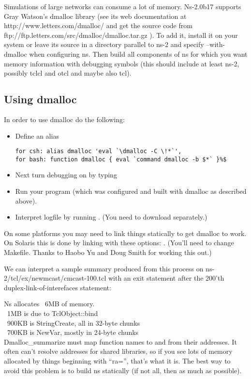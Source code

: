 Simulations of large networks can consume a lot of memory. Ns-2.0b17
supports Gray Watson's dmalloc library (see its web documentation at
http://www.letters.com/dmalloc/ and get the source code from
ftp://ftp.letters.com/src/dmalloc/dmalloc.tar.gz ).
To add it, install it on your system or leave its source in
a directory parallel to ns-2 and specify --with-dmalloc when configuring
ns. Then build all components of ns for which you want memory information
with debugging symbols (this should include at least ns-2, possibly tclcl
and otcl and maybe also tcl). 


\subsection{Using dmalloc}
\label{sec:usedmalloc}

In order to use dmalloc do the following:
\begin{itemize}
\item Define an alias 
\begin{verbatim}
for csh: alias dmalloc 'eval `\dmalloc -C \!*`', 
for bash: function dmalloc { eval `command dmalloc -b $*` }%$
\end{verbatim}
\item Next turn debugging on by typing 
\item Run your program (which was configured and built with dmalloc as
described above). 
\item Interpret logfile by running .
(You need to download  separately.) 
\end{itemize}

On some platforms you may need to link things statically to get dmalloc to
work. On Solaris this is done by linking with these options:
.
(You'll need to change Makefile. Thanks to
Haobo Yu and Doug Smith for working this out.) 

We can interpret a sample summary produced from this process on
ns-2/tcl/ex/newmcast/cmcast-100.tcl with an exit statement after the
200'th duplex-link-of-interefaces statement: 

Ns allocates ~6MB of memory. \\
~1MB is due to TclObject::bind \\
~900KB is StringCreate, all in 32-byte chunks \\
~700KB is NewVar, mostly in 24-byte chunks \\
Dmalloc\_summarize must map function names to and from their addresses. It
often can't resolve addresses for shared libraries, so if you see lots of
memory allocated by things beginning with ``ra='', that's what it is. The
best way to avoid this problem is to build ns statically (if not all, then
as much as possible). 

